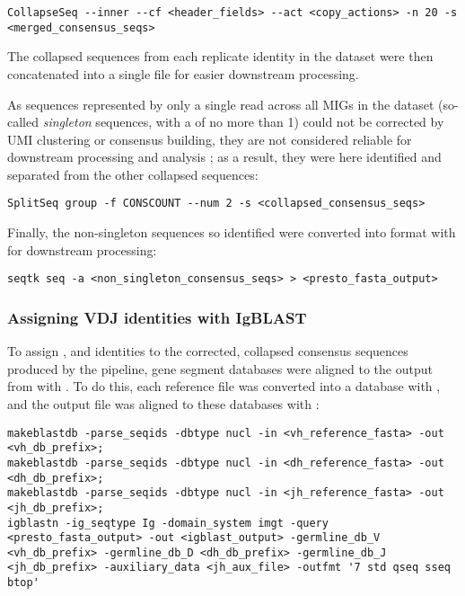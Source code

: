 \begin{lstlisting}
CollapseSeq --inner --cf <header_fields> --act <copy_actions> -n 20 -s <merged_consensus_seqs>
\end{lstlisting}

\noindent The collapsed sequences from each replicate identity in the dataset were then concatenated into a single file for easier downstream processing. 

As sequences represented by only a single read across all MIGs in the dataset (so-called \textit{singleton} sequences, with a  of no more than 1) could not be corrected by UMI clustering or consensus building, they are not considered reliable for downstream processing and analysis \parencite{vanderheiden2018perscomm}; as a result, they were here identified and separated from the other collapsed sequences:

\begin{lstlisting}
SplitSeq group -f CONSCOUNT --num 2 -s <collapsed_consensus_seqs>
\end{lstlisting}

\noindent Finally, the non-singleton sequences so identified were converted into  format with  \parencite{li2016seqtk} for downstream processing:

\begin{lstlisting}
seqtk seq -a <non_singleton_consensus_seqs> > <presto_fasta_output>
\end{lstlisting}

\subsubsection{Assigning VDJ identities with IgBLAST}
\label{sec:methods_comp_igpreproc_igblast}

To assign \vh, \dh and \jh identities to the corrected, collapsed consensus sequences produced by the  pipeline, gene segment databases were aligned to the  output from  with  \parencite{ye2013igblast}. To do this, each reference file was converted into a  database with , and the output  file was aligned to these databases with :

\begin{lstlisting}
makeblastdb -parse_seqids -dbtype nucl -in <vh_reference_fasta> -out <vh_db_prefix>;
makeblastdb -parse_seqids -dbtype nucl -in <dh_reference_fasta> -out <dh_db_prefix>;
makeblastdb -parse_seqids -dbtype nucl -in <jh_reference_fasta> -out <jh_db_prefix>;
igblastn -ig_seqtype Ig -domain_system imgt -query <presto_fasta_output> -out <igblast_output> -germline_db_V <vh_db_prefix> -germline_db_D <dh_db_prefix> -germline_db_J <jh_db_prefix> -auxiliary_data <jh_aux_file> -outfmt '7 std qseq sseq btop'
\end{lstlisting}

